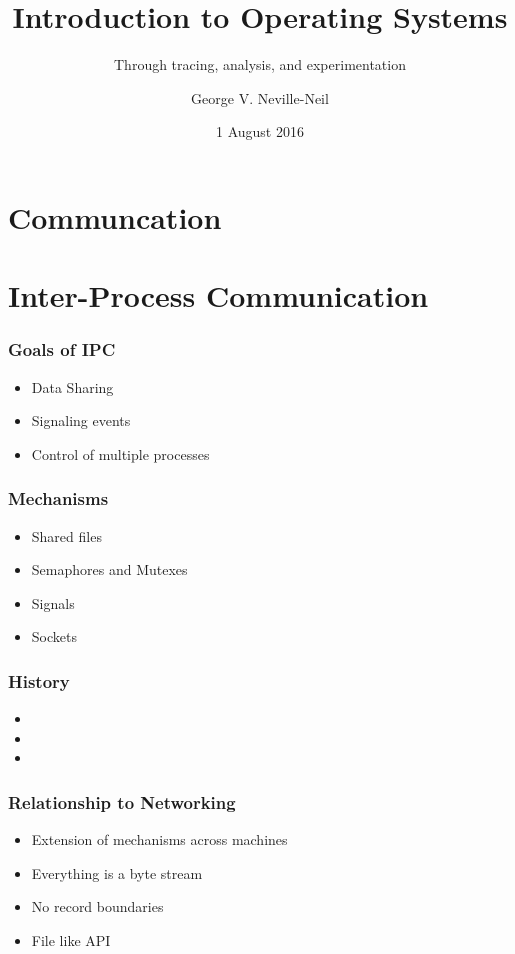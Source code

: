 \documentclass[pdftex]{beamer} %
\begin{document}

\title{Introduction to Operating Systems}
\subtitle{Through tracing, analysis, and experimentation}
\author{George V. Neville-Neil}
\date{1 August 2016}

\begin{frame}
  \titlepage
\end{frame}

\section{Communcation}
\label{sec:communication}

\section{Inter-Process Communication}
\label{sec:ipc}

\begin{frame}
  \frametitle{Goals of IPC}
  \begin{itemize}
  \item Data Sharing
  \item Signaling events
  \item Control of multiple processes
  \end{itemize}
\end{frame}

\begin{frame}
  \frametitle{Mechanisms}
  \begin{itemize}
  \item Shared files
  \item Semaphores and Mutexes
  \item Signals
  \item Sockets
  \end{itemize}
\end{frame}

\begin{frame}
  \frametitle{History}
  \begin{itemize}
  \item 
  \item 
  \item 
  \end{itemize}
\end{frame}

\begin{frame}
  \frametitle{Relationship to Networking}
  \begin{itemize}
  \item Extension of mechanisms across machines
  \item Everything is a byte stream
  \item No record boundaries
  \item File like API
  \end{itemize}
\end{frame}
\end{document}
